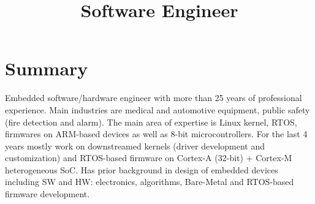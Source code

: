 \documentclass[11pt,a4paper]{moderncv}
\title{Software Engineer}
\begin{document}
\renewcommand*{\bibliographyhead}[1]{}


\maketitle

\section{Summary}
Embedded software/hardware engineer with more than 25 years of professional experience.
Main industries are medical and automotive equipment, public safety (fire detection and alarm).
The main area of expertise is Linux kernel, RTOS, firmwares on ARM-based devices
as well as 8-bit microcontrollers.
For the last 4 years mostly work on downstreamed kernels (driver development and customization) and
RTOS-based firmware on Cortex-A (32-bit) + Cortex-M heterogeneous SoC.
Has prior background in design of embedded devices including SW and HW: electronics, algorithms,
Bare-Metal and RTOS-based firmware development.
\end{document}
